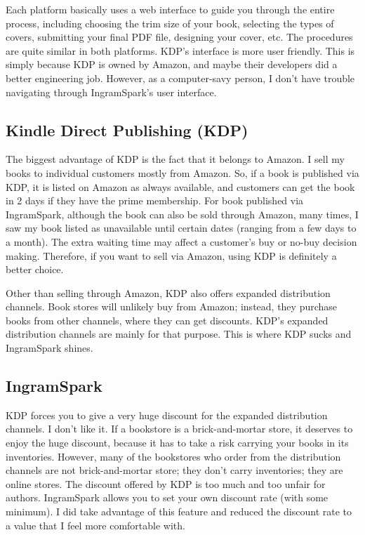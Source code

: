 Each platform basically uses a web interface to guide you through the entire process,
including choosing the trim size of your book, selecting the types of covers, submitting your
final PDF file, designing your cover, etc. The procedures are quite similar in both platforms. 
KDP's interface is more user friendly. This is simply because KDP is owned by Amazon, and
maybe their developers did a better engineering job. However, as a computer-savy person, I 
don't have trouble navigating through IngramSpark's user interface.



\subsection{Kindle Direct Publishing (KDP)}

The biggest advantage of KDP is the fact that it belongs to Amazon. I sell my books to
individual customers mostly from Amazon. So, if a book is published via KDP, it is listed on
Amazon as always available, and customers can get the book in 2 days if they have the prime
membership.  For book published via IngramSpark, although the book can also be
sold through Amazon, many times, I saw my book listed as unavailable until certain dates
(ranging from a few days to a month). The extra waiting time may affect a customer's buy or
no-buy decision making.  
Therefore, if you want to sell via Amazon, using KDP is definitely a better choice. 


Other than selling through Amazon, KDP also offers expanded distribution channels. Book stores
will unlikely buy from Amazon; instead, they purchase books from other channels, where they can
get discounts. KDP's expanded distribution channels are mainly for that purpose. 
This is where KDP sucks and IngramSpark shines. 


\subsection{IngramSpark} 

KDP forces you to give a very huge discount for the expanded distribution channels. I don't
like it. If a bookstore is a brick-and-mortar store, it deserves to enjoy the huge discount,
because it has to take a risk carrying your books in its inventories. However, many of the
bookstores who order from the distribution channels are not brick-and-mortar store; they
don't carry inventories; they are online stores. The discount offered by KDP is too much and
too unfair for authors. 
IngramSpark allows you to set your own discount rate (with some minimum). I did take advantage
of this feature and reduced the discount rate to a value that I feel more comfortable with. 


